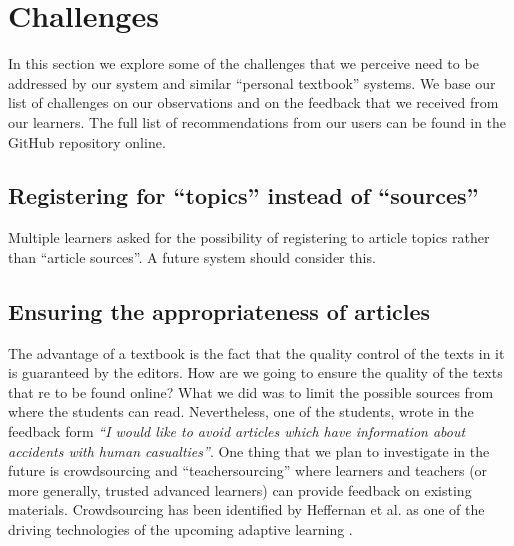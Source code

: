 \section{Challenges}
\label{sec:challenges}

In this section we explore some of the challenges that we perceive need to be addressed by our system and similar ``personal textbook'' systems. We base our list of challenges on our observations and on the feedback that we received from our learners. The full list of recommendations from our users can be found in the GitHub repository online.

\subsection{Registering for ``topics'' instead of ``sources''}
Multiple learners asked for the possibility of registering to article topics rather than ``article sources''. A future system should consider this.

\subsection{Ensuring the appropriateness of articles}
The advantage of a textbook is the fact that the quality control of the texts in it is guaranteed by the editors. How are we going to ensure the quality of the texts that re to be found online? What we did was to limit the possible sources from where the students can read. Nevertheless, one of the students, wrote in the feedback form {\em ``I would like to avoid articles which have information about accidents with human casualties''}. One thing that we plan to investigate in the future is crowdsourcing and ``teachersourcing'' where learners and teachers (or more generally, trusted advanced learners) can provide feedback on existing materials. Crowdsourcing has been identified by Heffernan et al. as one of the driving technologies of the upcoming adaptive learning \cite{Heff16-crowdsourcing}. 




